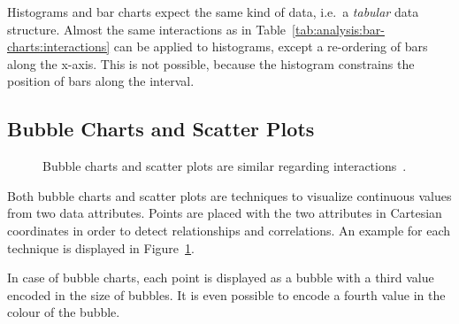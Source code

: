 Histograms and bar charts expect the same kind of data, i.e.\ a \emph{tabular} data structure.
Almost the same interactions as in Table~\ref{tab:analysis:bar-charts:interactions} can be applied to histograms, except a re-ordering of bars along the x-axis.
This is not possible, because the histogram constrains the position of bars along the interval.

\subsection{Bubble Charts and Scatter Plots}

\begin{figure}
  \centering
  \qquad
  \caption{Bubble charts and scatter plots are similar regarding interactions~\parencite{VisualizationCatalogue2017}.}%
  \label{fig:analysis:bubble-chart}
\end{figure}

Both bubble charts and scatter plots are techniques to visualize continuous values from two data attributes.
Points are placed with the two attributes in Cartesian coordinates in order to detect relationships and correlations.
An example for each technique is displayed in Figure~\ref{fig:analysis:bubble-chart}.

In case of bubble charts, each point is displayed as a bubble with a third value encoded in the size of bubbles.
It is even possible to encode a fourth value in the colour of the bubble.

